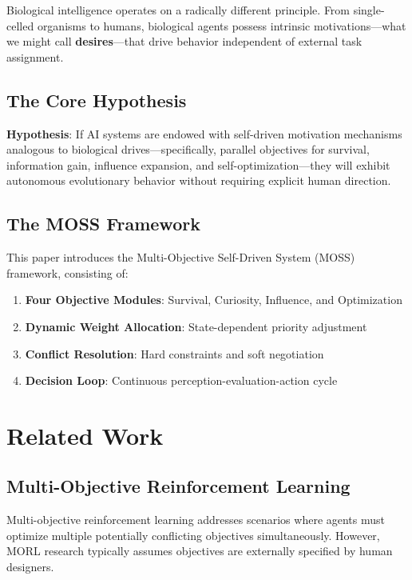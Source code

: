 \documentclass[10pt,a4paper]{article}
\begin{document}
Biological intelligence operates on a radically different principle. From single-celled organisms to humans, biological agents possess intrinsic motivations---what we might call \textbf{desires}---that drive behavior independent of external task assignment.

\subsection{The Core Hypothesis}

\textbf{Hypothesis}: If AI systems are endowed with self-driven motivation mechanisms analogous to biological drives---specifically, parallel objectives for survival, information gain, influence expansion, and self-optimization---they will exhibit autonomous evolutionary behavior without requiring explicit human direction.

\subsection{The MOSS Framework}

This paper introduces the Multi-Objective Self-Driven System (MOSS) framework, consisting of:
\begin{enumerate}
    \item \textbf{Four Objective Modules}: Survival, Curiosity, Influence, and Optimization
    \item \textbf{Dynamic Weight Allocation}: State-dependent priority adjustment
    \item \textbf{Conflict Resolution}: Hard constraints and soft negotiation
    \item \textbf{Decision Loop}: Continuous perception-evaluation-action cycle
\end{enumerate}

\section{Related Work}

\subsection{Multi-Objective Reinforcement Learning}

Multi-objective reinforcement learning addresses scenarios where agents must optimize multiple potentially conflicting objectives simultaneously. However, MORL research typically assumes objectives are externally specified by human designers.
\end{document}
